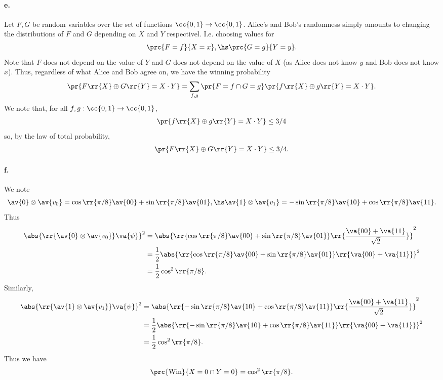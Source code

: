 \documentclass{article}
\begin{document}
\paragraph{e.} Let $F,G$ be random variables over the set of functions $\cc{0,1}\to\cc{0,1}$.
Alice's and Bob's randomness simply amounts to changing the distributions of $F$ and $G$
depending on $X$ and $Y$ respectivel. I.e. choosing values for
\begin{align*}
  \prc{F=f}{X=x}, \hs \prc{G=g}{Y=y}.
\end{align*}
Note that $F$ does not depend on the value of $Y$ and $G$ does not depend on the value of
$X$ (as Alice does not know $y$ and Bob does not know $x$).
Thus, regardless of what Alice and Bob agree on, we have the winning probability
\begin{align*}
  \pr{F\rr{X}\oplus G\rr{Y}=X\cdot Y} = \sum_{f,g}\pr{F=f\cap G=g}\pr{f\rr{X}\oplus g\rr{Y}=X\cdot Y}.
\end{align*}
We note that, for all $f,g:\cc{0,1}\to\cc{0,1}$,
\begin{align*}
  \pr{f\rr{X}\oplus g\rr{Y}=X\cdot Y}\leq 3/4
\end{align*}
so, by the law of total probability,
\begin{align*}
  \pr{F\rr{X}\oplus G\rr{Y}=X\cdot Y} \leq 3/4.
\end{align*}

\paragraph{f.} We note
\begin{align*}
  \av{0}\otimes \av{v_0} = \cos\rr{\pi/8} \av{00} + \sin\rr{\pi/8}\av{01} , \hs
  \av{1}\otimes \av{v_1} = - \sin\rr{\pi/8}\av{10} + \cos\rr{\pi/8} \av{11}.
\end{align*}
Thus
\begin{align*}
  \abs{\rr{\av{0}\otimes\av{v_0}}\va{\psi}}^2
  &= \abs{\rr{\cos\rr{\pi/8} \av{00} + \sin\rr{\pi/8}\av{01}}\rr{\frac{\va{00}+\va{11}}{\sqrt{2}}}}^2 \\
  &=\frac{1}{2}\abs{\rr{\cos\rr{\pi/8} \av{00} + \sin\rr{\pi/8}\av{01}}\rr{\va{00}+\va{11}}}^2 \\
  &=\frac{1}{2}\cos^2\rr{\pi/8}.
\end{align*}
Similarly,
\begin{align*}
  \abs{\rr{\av{1}\otimes\av{v_1}}\va{\psi}}^2
  &= \abs{\rr{-\sin\rr{\pi/8} \av{10} + \cos\rr{\pi/8}\av{11}}\rr{\frac{\va{00}+\va{11}}{\sqrt{2}}}}^2 \\
  &=\frac{1}{2}\abs{\rr{-\sin\rr{\pi/8} \av{10} + \cos\rr{\pi/8}\av{11}}\rr{\va{00}+\va{11}}}^2 \\
  &=\frac{1}{2}\cos^2\rr{\pi/8}.
\end{align*}
Thus we have
\begin{align*}
  \prc{\text{Win}}{X=0\cap Y=0} = \cos^2\rr{\pi/8}.
\end{align*}
\end{document}

